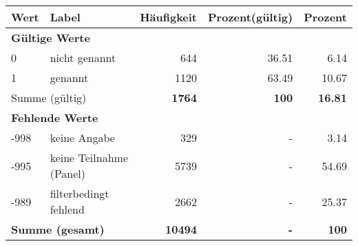     \begin{longtable}{lXrrr}
     \toprule
     \textbf{Wert} & \textbf{Label} & \textbf{Häufigkeit} & \textbf{Prozent(gültig)} & \textbf{Prozent} \\
     \endhead
     \midrule
     \multicolumn{5}{l}{\textbf{Gültige Werte}}\\

     0 &
     \multicolumn{1}{X}{ nicht genannt   } &


       \num{644} &
       \num[round-mode=places,round-precision=2]{36,51} &
         \num[round-mode=places,round-precision=2]{6,14} \\

     1 &
     \multicolumn{1}{X}{ genannt   } &


       \num{1120} &
       \num[round-mode=places,round-precision=2]{63,49} &
         \num[round-mode=places,round-precision=2]{10,67} \\
     \midrule
     \multicolumn{2}{l}{Summe (gültig)} &
       \textbf{\num{1764}} &
     \textbf{100} &
       \textbf{\num[round-mode=places,round-precision=2]{16,81}} \\
     \multicolumn{5}{l}{\textbf{Fehlende Werte}}\\
       -998 &
       keine Angabe &
         \num{329} &
        - &
         \num[round-mode=places,round-precision=2]{3,14} \\
       -995 &
       keine Teilnahme (Panel) &
         \num{5739} &
        - &
         \num[round-mode=places,round-precision=2]{54,69} \\
       -989 &
       filterbedingt fehlend &
         \num{2662} &
        - &
         \num[round-mode=places,round-precision=2]{25,37} \\
     \midrule
     \multicolumn{2}{l}{\textbf{Summe (gesamt)}} &
          \textbf{\num{10494}} &
        \textbf{-} &
        \textbf{100} \\
     \bottomrule
     \end{longtable}
     
